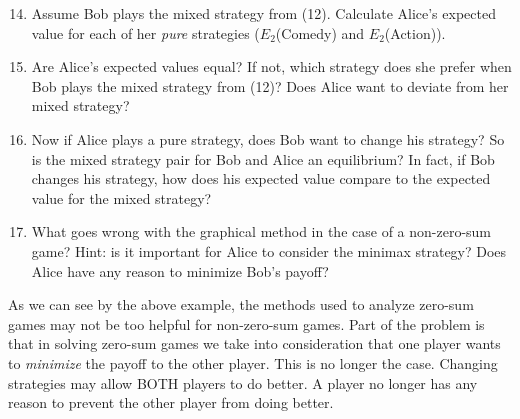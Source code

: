 \begin{enumerate}
\setcounter{enumi}{13}

\item Assume Bob plays the mixed strategy from (12). Calculate Alice's expected value for each of her {\it pure} strategies ($E_2$(Comedy) and $E_2$(Action)).

\item  Are Alice's expected values equal? If not, which strategy does she prefer when Bob plays the mixed strategy from (12)? Does Alice want to deviate from her mixed strategy?

\item Now if Alice plays a pure strategy, does Bob want to change his strategy? So is the mixed strategy pair for Bob and Alice an equilibrium? In fact, if Bob changes his strategy, how does his expected value compare to the expected value for the mixed strategy?

\item What goes wrong with the graphical method in the case of a non-zero-sum game? Hint: is it important for Alice to consider the minimax strategy? Does Alice have any reason to minimize Bob's payoff?
\end{enumerate} 

As we can see by the above example, the methods used to analyze zero-sum games may not be too helpful for non-zero-sum games. Part of the problem is that in solving zero-sum games we take into consideration that one player wants to {\it minimize} the payoff to the other player. This is no longer the case. Changing strategies may allow BOTH players to do better. A player no longer has any reason to prevent the other player from doing better. 


